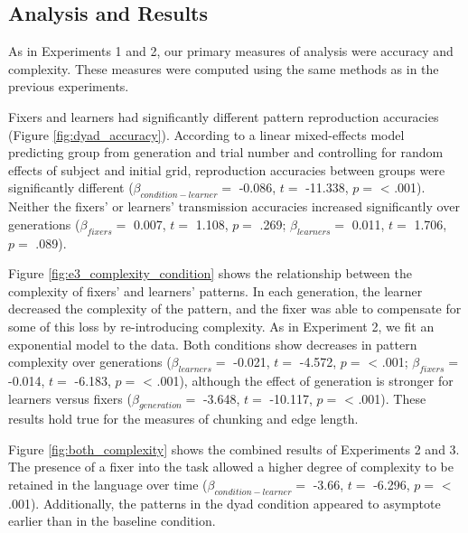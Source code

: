 \documentclass[10pt, letterpaper]{article}
\begin{document}
\subsection{Analysis and Results}\label{analysis-and-results}

As in Experiments 1 and 2, our primary measures of analysis were
accuracy and complexity. These measures were computed using the same
methods as in the previous experiments.

Fixers and learners had significantly different pattern reproduction
accuracies (Figure \ref{fig:dyad_accuracy}). According to a linear
mixed-effects model predicting group from generation and trial number
and controlling for random effects of subject and initial grid,
reproduction accuracies between groups were significantly different
(\(\beta_{condition-learner} =\) -0.086, \(t =\) -11.338, \(p =\)
\textless{} .001). Neither the fixers' or learners' transmission
accuracies increased significantly over generations
(\(\beta_{fixers} =\) 0.007, \(t =\) 1.108, \(p =\) .269;
\(\beta_{learners} =\) 0.011, \(t =\) 1.706, \(p =\) .089).

Figure \ref{fig:e3_complexity_condition} shows the relationship between
the complexity of fixers' and learners' patterns. In each generation,
the learner decreased the complexity of the pattern, and the fixer was
able to compensate for some of this loss by re-introducing complexity.
As in Experiment 2, we fit an exponential model to the data. Both
conditions show decreases in pattern complexity over generations
(\(\beta_{learners} =\) -0.021, \(t =\) -4.572, \(p =\) \textless{}
.001; \(\beta_{fixers} =\) -0.014, \(t =\) -6.183, \(p =\) \textless{}
.001), although the effect of generation is stronger for learners versus
fixers (\(\beta_{generation} =\) -3.648, \(t =\) -10.117, \(p =\)
\textless{} .001). These results hold true for the measures of chunking
and edge length.

Figure \ref{fig:both_complexity} shows the combined results of
Experiments 2 and 3. The presence of a fixer into the task allowed a
higher degree of complexity to be retained in the language over time
(\(\beta_{condition-learner} =\) -3.66, \(t =\) -6.296, \(p =\)
\textless{} .001). Additionally, the patterns in the dyad condition
appeared to asymptote earlier than in the baseline condition.
\end{document}
